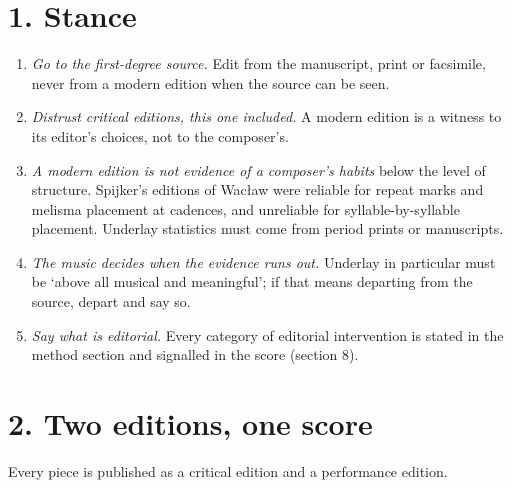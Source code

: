 \providecommand\tightlist{\setlength{\itemsep}{0pt}\setlength{\parskip}{0pt}}
\section*{1. Stance}

\begin{enumerate}

\tightlist
\item
  \textit{Go to the first-degree source.} Edit from the manuscript, print or facsimile, never from a modern edition when the source can be seen.
\item
  \textit{Distrust critical editions, this one included.} A modern edition is a witness to its editor's choices, not to the composer's.
\item
  \textit{A modern edition is not evidence of a composer's habits} below the level of structure. Spijker's editions of Wacław were reliable for repeat marks and melisma placement at cadences, and unreliable for syllable-by-syllable placement. Underlay statistics must come from period prints or manuscripts.
\item
  \textit{The music decides when the evidence runs out.} Underlay in particular must be ‘above all musical and meaningful’; if that means departing from the source, depart and say so.
\item
  \textit{Say what is editorial.} Every category of editorial intervention is stated in the method section and signalled in the score (section 8).
\end{enumerate}

\section*{2. Two editions, one score}

Every piece is published as a critical edition and a performance edition.

